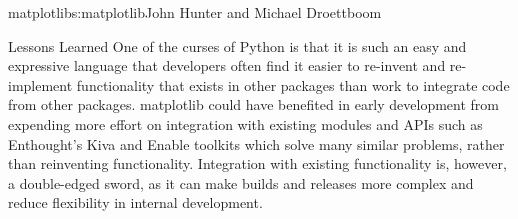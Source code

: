 \begin{aosachapter}{matplotlib}{s:matplotlib}{John Hunter and Michael Droettboom}
\begin{aosasect1}{Lessons Learned}
One of the curses of Python is that it is such an easy and expressive
language that developers often find it easier to re-invent and
re-implement functionality that exists in other packages than
work to integrate code from other packages.  matplotlib could have
benefited in early development from expending more effort on
integration with existing modules and APIs such as Enthought's Kiva
and Enable toolkits which solve many similar problems, rather than
reinventing functionality.  Integration with existing functionality
is, however, a double-edged sword, as it can make builds and releases
more complex and reduce flexibility in internal development.

\end{aosasect1}
\end{aosachapter}
